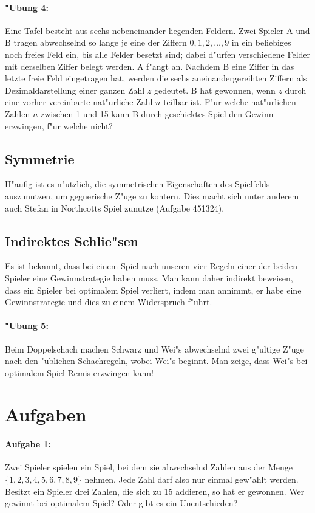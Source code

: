 \documentclass[a4paper,11pt]{article}
\begin{document}
\paragraph*{"Ubung 4:} 
Eine Tafel besteht aus sechs nebeneinander liegenden Feldern.  Zwei Spieler A
und B tragen abwechselnd so lange je eine der Ziffern $0,1,2,\ldots,9$ in ein
beliebiges noch freies Feld ein, bis alle Felder besetzt sind; dabei d"urfen
verschiedene Felder mit derselben Ziffer belegt werden. A f"angt an. Nachdem B
eine Ziffer in das letzte freie Feld eingetragen hat, werden die sechs
aneinandergereihten Ziffern als Dezimaldarstellung einer ganzen Zahl $z$
gedeutet.  B hat gewonnen, wenn $z$ durch eine vorher vereinbarte nat"urliche
Zahl $n$ teilbar ist. F"ur welche nat"urlichen Zahlen $n$ zwischen 1 und 15
kann B durch geschicktes Spiel den Gewinn erzwingen, f"ur welche nicht?

\subsection{Symmetrie}
H"aufig ist es n"utzlich, die symmetrischen Eigenschaften des Spielfelds
auszunutzen, um gegnerische Z"uge zu kontern. Dies macht sich unter anderem
auch Stefan in Northcotts Spiel zunutze (Aufgabe 451324).

\subsection{Indirektes Schlie"sen}
Es ist bekannt, dass bei einem Spiel nach unseren vier Regeln einer der beiden
Spieler eine Gewinnstrategie haben muss. Man kann daher indirekt beweisen,
dass ein Spieler bei optimalem Spiel verliert, indem man annimmt, er habe eine
Gewinnstrategie und dies zu einem Widerspruch f"uhrt.

\paragraph*{"Ubung 5:} Beim Doppelschach machen Schwarz und Wei"s abwechselnd
zwei g"ultige Z"uge nach den "ublichen Schachregeln, wobei Wei"s beginnt. Man
zeige, dass Wei"s bei optimalem Spiel Remis erzwingen kann!

\section{Aufgaben}

\paragraph*{Aufgabe 1:} 
Zwei Spieler spielen ein Spiel, bei dem sie abwechselnd Zahlen aus der Menge
$\{1,2,3,4,5,6,7,8,9\}$ nehmen.  Jede Zahl darf also nur einmal gew"ahlt
werden. Besitzt ein Spieler drei Zahlen, die sich zu 15 addieren, so hat er
gewonnen.  Wer gewinnt bei optimalem Spiel?  Oder gibt es ein Unentschieden?
\end{document}
